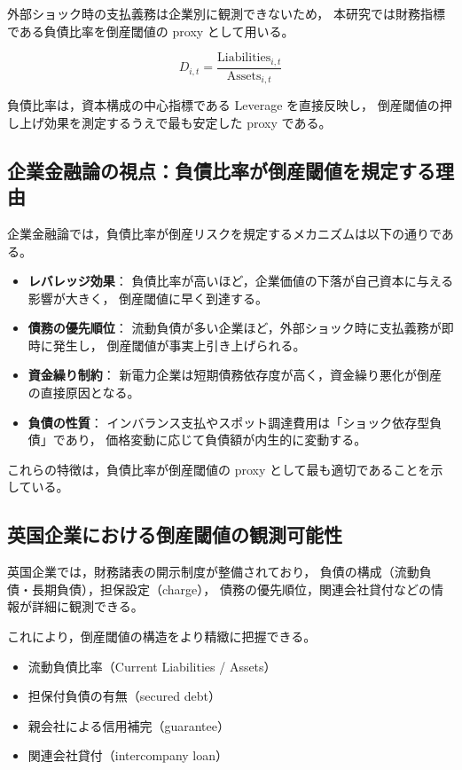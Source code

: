 外部ショック時の支払義務は企業別に観測できないため，
本研究では財務指標である負債比率を倒産閾値の proxy として用いる。



\[
D_{i,t} = \frac{\mathrm{Liabilities}_{i,t}}{\mathrm{Assets}_{i,t}}
\]



負債比率は，資本構成の中心指標である Leverage を直接反映し，
倒産閾値の押し上げ効果を測定するうえで最も安定した proxy である。

\subsection{企業金融論の視点：負債比率が倒産閾値を規定する理由}

企業金融論では，負債比率が倒産リスクを規定するメカニズムは以下の通りである。

\begin{itemize}
    \item \textbf{レバレッジ効果}：
          負債比率が高いほど，企業価値の下落が自己資本に与える影響が大きく，
          倒産閾値に早く到達する。
    \item \textbf{債務の優先順位}：
          流動負債が多い企業ほど，外部ショック時に支払義務が即時に発生し，
          倒産閾値が事実上引き上げられる。
    \item \textbf{資金繰り制約}：
          新電力企業は短期債務依存度が高く，資金繰り悪化が倒産の直接原因となる。
    \item \textbf{負債の性質}：
          インバランス支払やスポット調達費用は「ショック依存型負債」であり，
          価格変動に応じて負債額が内生的に変動する。
\end{itemize}

これらの特徴は，負債比率が倒産閾値の proxy として最も適切であることを示している。

\subsection{英国企業における倒産閾値の観測可能性}

英国企業では，財務諸表の開示制度が整備されており，
負債の構成（流動負債・長期負債），担保設定（charge），
債務の優先順位，関連会社貸付などの情報が詳細に観測できる。

これにより，倒産閾値の構造をより精緻に把握できる。

\begin{itemize}
    \item 流動負債比率（Current Liabilities / Assets）
    \item 担保付負債の有無（secured debt）
    \item 親会社による信用補完（guarantee）
    \item 関連会社貸付（intercompany loan）
\end{itemize}

